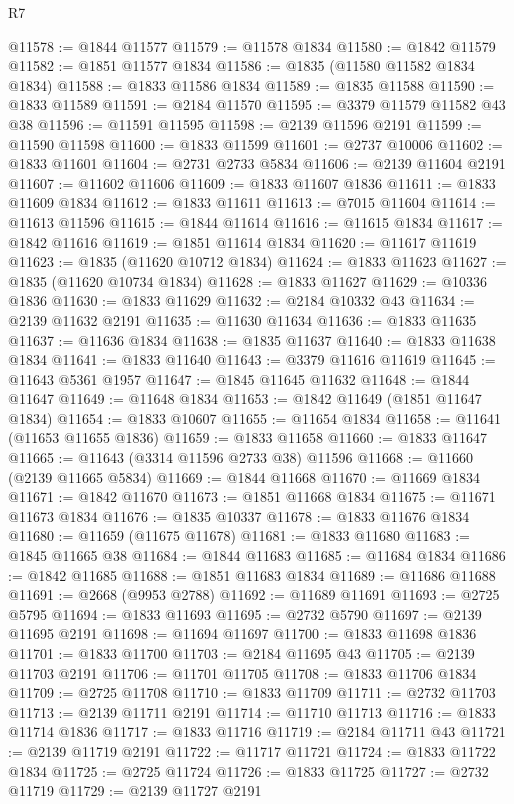 \begin{lexlean}{R7}
\begin{coremodule}
@11578 := @1844 @11577
@11579 := @11578 @1834
@11580 := @1842 @11579
@11582 := @1851 @11577 @1834
@11586 := @1835 (@11580 @11582 @1834 @1834)
@11588 := @1833 @11586 @1834
@11589 := @1835 @11588
@11590 := @1833 @11589
@11591 := @2184 @11570
@11595 := @3379 @11579 @11582 @43 @38
@11596 := @11591 @11595
@11598 := @2139 @11596 @2191
@11599 := @11590 @11598
@11600 := @1833 @11599
@11601 := @2737 @10006
@11602 := @1833 @11601
@11604 := @2731 @2733 @5834
@11606 := @2139 @11604 @2191
@11607 := @11602 @11606
@11609 := @1833 @11607 @1836
@11611 := @1833 @11609 @1834
@11612 := @1833 @11611
@11613 := @7015 @11604
@11614 := @11613 @11596
@11615 := @1844 @11614
@11616 := @11615 @1834
@11617 := @1842 @11616
@11619 := @1851 @11614 @1834
@11620 := @11617 @11619
@11623 := @1835 (@11620 @10712 @1834)
@11624 := @1833 @11623
@11627 := @1835 (@11620 @10734 @1834)
@11628 := @1833 @11627
@11629 := @10336 @1836
@11630 := @1833 @11629
@11632 := @2184 @10332 @43
@11634 := @2139 @11632 @2191
@11635 := @11630 @11634
@11636 := @1833 @11635
@11637 := @11636 @1834
@11638 := @1835 @11637
@11640 := @1833 @11638 @1834
@11641 := @1833 @11640
@11643 := @3379 @11616 @11619
@11645 := @11643 @5361 @1957
@11647 := @1845 @11645 @11632
@11648 := @1844 @11647
@11649 := @11648 @1834
@11653 := @1842 @11649 (@1851 @11647 @1834)
@11654 := @1833 @10607
@11655 := @11654 @1834
@11658 := @11641 (@11653 @11655 @1836)
@11659 := @1833 @11658
@11660 := @1833 @11647
@11665 := @11643 (@3314 @11596 @2733 @38) @11596
@11668 := @11660 (@2139 @11665 @5834)
@11669 := @1844 @11668
@11670 := @11669 @1834
@11671 := @1842 @11670
@11673 := @1851 @11668 @1834
@11675 := @11671 @11673 @1834
@11676 := @1835 @10337
@11678 := @1833 @11676 @1834
@11680 := @11659 (@11675 @11678)
@11681 := @1833 @11680
@11683 := @1845 @11665 @38
@11684 := @1844 @11683
@11685 := @11684 @1834
@11686 := @1842 @11685
@11688 := @1851 @11683 @1834
@11689 := @11686 @11688
@11691 := @2668 (@9953 @2788)
@11692 := @11689 @11691
@11693 := @2725 @5795
@11694 := @1833 @11693
@11695 := @2732 @5790
@11697 := @2139 @11695 @2191
@11698 := @11694 @11697
@11700 := @1833 @11698 @1836
@11701 := @1833 @11700
@11703 := @2184 @11695 @43
@11705 := @2139 @11703 @2191
@11706 := @11701 @11705
@11708 := @1833 @11706 @1834
@11709 := @2725 @11708
@11710 := @1833 @11709
@11711 := @2732 @11703
@11713 := @2139 @11711 @2191
@11714 := @11710 @11713
@11716 := @1833 @11714 @1836
@11717 := @1833 @11716
@11719 := @2184 @11711 @43
@11721 := @2139 @11719 @2191
@11722 := @11717 @11721
@11724 := @1833 @11722 @1834
@11725 := @2725 @11724
@11726 := @1833 @11725
@11727 := @2732 @11719
@11729 := @2139 @11727 @2191

\end{coremodule}
\end{lexlean}
